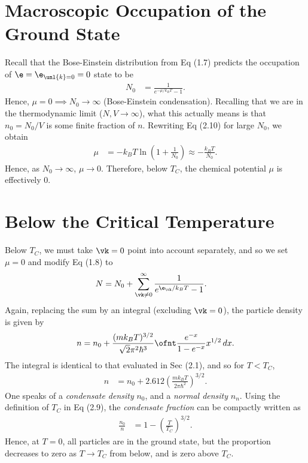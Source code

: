 \documentclass[a4paper, 11pt, normalem]{report}
\begin{document}
\section{Macroscopic Occupation of the Ground State}
Recall that the Bose-Einstein distribution from Eq (1.7) predicts the occupation of $\e=\e_{\unl{k}=0}=0$ state to be
\begin{align}
    N_0 &= \frac{1}{e^{-\mu/k_BT}-1}.
\end{align}
Hence, $\mu=0\implies N_0\to\infty$ (Bose-Einstein condensation).
Recalling that we are in the thermodynamic limit ($N,V\to\infty$), what this actually means is that $n_0=N_0/V$ is some finite fraction of $n$.
Rewriting Eq (2.10) for large $N_0$, we obtain
\begin{align}
    \mu &= -k_BT\ln\left(1+\frac{1}{N_0}\right) \approx -\frac{k_BT}{N_0}.
\end{align}
Hence, as $N_0\to\infty$, $\mu\to0$.
Therefore, below $T_C$, the chemical potential $\mu$ is effectively 0.

\section{Below the Critical Temperature}
Below $T_C$, we must take $\vk=0$ point into account separately, and so we set $\mu=0$ and modify Eq (1.8) to
\begin{align}
    N &= N_0 + \sum_{\vk\neq0}^\infty \frac{1}{e^{\e_{\vk}/k_BT}-1}.
\end{align}
Again, replacing the sum by an integral (excluding $\vk=0$), the particle density is given by
\begin{align}
    n = n_0 + \frac{(mk_BT)^{3/2}}{\sqrt{2}\pi^2\hbar^3}\ofnt \frac{e^{-x}}{1-e^{-x}}x^{1/2}\,dx.
\end{align}
The integral is identical to that evaluated in Sec (2.1), and so for $T<T_C$,
\begin{align}
    n &= n_0 + 2.612\left(\frac{mk_BT}{2\pi\hbar^2}\right)^{3/2}.
\end{align}
One speaks of a \emph{condensate density} $n_0$, and a \emph{normal density} $n_n$.
Using the definition of $T_C$ in Eq (2.9), the \emph{condensate fraction} can be compactly written as
\begin{align}
    \frac{n_0}{n} &= 1-\left(\frac{T}{T_C}\right)^{3/2}.
\end{align}
Hence, at $T=0$, all particles are in the ground state, but the proportion decreases to zero as $T\to T_C$ from below, and is zero above $T_C$.
\end{document}
